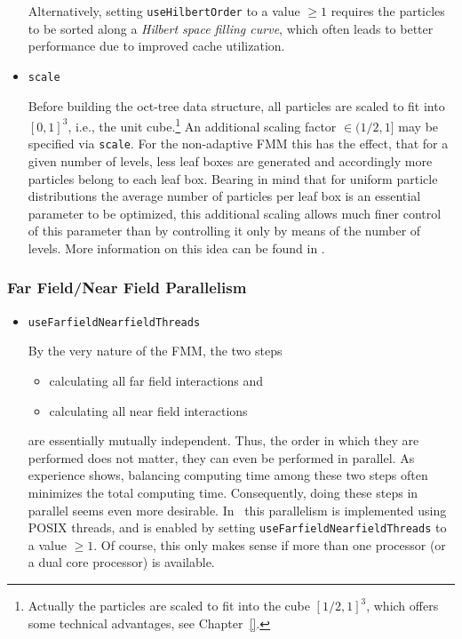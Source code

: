 \begin{itemize}
Alternatively, setting \verb|useHilbertOrder|  to a value
$\geq 1$ requires  the particles to be sorted along a {\em Hilbert space filling
curve}, which often leads to better performance due
to improved cache utilization. 

   \item\verb|scale|

   Before building the oct-tree data structure, all particles are scaled
   to fit into  $[0,1]^3$, i.e., the unit cube.\footnote{Actually the 
   particles are scaled to fit into the cube $[1/2,1]^3$, which
   offers some technical advantages, see Chapter~\ref{}.}
   An additional scaling factor $\in (1/2,1]$
   may be specified via \verb|scale|.
   For the non-adaptive FMM this has the effect, that for a given
   number of levels, less leaf boxes are generated 
   and accordingly more particles belong to each leaf box.
   Bearing in mind that for uniform particle distributions
   the average number of particles per leaf box
   is an essential parameter to be optimized, this 
   additional scaling allows 
   much finer control of this parameter than by controlling it 
   only by means of the number of levels. 
   More information on this idea can be found in \cite{fractional}.
   
   
\end{itemize}

\subsubsection*{Far Field/Near Field Parallelism}
\begin{itemize}
    \item\verb|useFarfieldNearfieldThreads|

    By the very nature of the FMM, the two steps
    \begin{itemize}
    \item calculating all far field interactions and
    \item calculating all near field interactions 
    \end{itemize}
    are essentially mutually independent. Thus, the
    order in which they are performed does not matter,
    they can even be performed in parallel.
    As experience shows, balancing computing time among these
    two steps often minimizes the total computing time. Consequently,
    doing these steps in parallel seems even more desirable.
    In \fmmv\ this parallelism is implemented using POSIX threads,
    and is enabled by setting \verb|useFarfieldNearfieldThreads|
    to a value $\geq 1$.
    Of course, this only makes sense if more than one processor 
    (or a dual core processor) is available.
    
    
\end{itemize}


